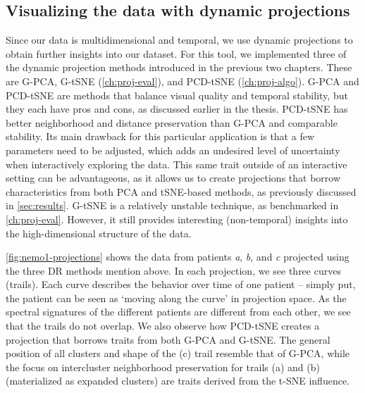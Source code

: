\subsection{Visualizing the data with dynamic projections}
\label{sec:nemo_pipeline_dr}
%
Since our data is multidimensional and temporal, we use dynamic projections to obtain further insights into our dataset.
For this tool, we implemented three of the dynamic projection methods introduced in the previous two chapters. These are G-PCA, G-tSNE (\cref{ch:proj-eval}), and PCD-tSNE (\cref{ch:proj-algo}). 
G-PCA and PCD-tSNE are methods that balance visual quality and temporal stability, but they each have pros and cons, as discussed earlier in the thesis. PCD-tSNE has better neighborhood and distance preservation than G-PCA and comparable stability. Its main drawback for this particular application is that a few parameters need to be adjusted, which adds an undesired level of uncertainty when interactively exploring the data. This same trait outside of an interactive setting can be advantageous, as it allows us to create projections that borrow characteristics from both PCA and tSNE-based methods, as previously discussed in \cref{sec:results}. %
G-tSNE is a relatively unstable technique, as benchmarked in \cref{ch:proj-eval}. However, it still provides interesting (non-temporal) insights into the high-dimensional structure of the data.

\cref{fig:nemo1-projections} shows the data from patients \textit{a}, \textit{b}, and \textit{c} projected using the three DR methods mention above. In each projection, we see three curves (trails). Each curve describes the behavior over time of one patient -- simply put, the patient can be seen as `moving along the curve' in projection space. As the spectral signatures of the different patients are different from each other, we see that the trails do not overlap. We also observe how PCD-tSNE creates a projection that borrows traits from both G-PCA and G-tSNE. The general position of all clusters and shape of the (c) trail resemble that of G-PCA, while the focus on intercluster neighborhood preservation for trails (a) and (b) (materialized as expanded clusters) are traits derived from the t-SNE influence.


